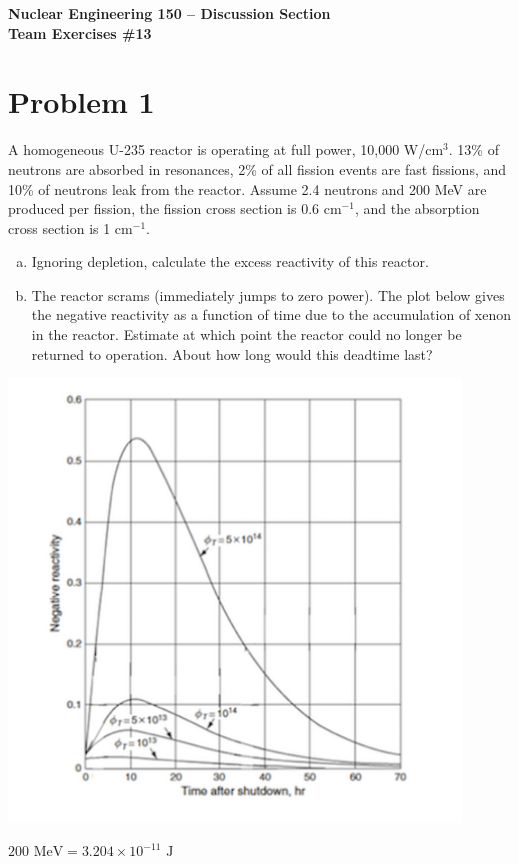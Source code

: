 \documentclass{report}
\begin{document}
\begin{center}
\textbf{\large Nuclear Engineering 150 -- Discussion Section}\\ 
\textbf{Team Exercises \#13}
\end{center}

\section*{Problem 1}

A homogeneous U-235 reactor is operating at full power, 10,000 W/cm$^3$. 13\% of neutrons are absorbed in resonances, 2\% of all fission events are fast fissions, and 10\% of neutrons leak from the reactor. Assume 2.4 neutrons and 200 MeV are produced per fission, the fission cross section is 0.6 cm$^{-1}$, and the absorption cross section is 1 cm$^{-1}$.
\begin{enumerate}[a)]
\item Ignoring depletion, calculate the excess reactivity of this reactor.
\item The reactor scrams (immediately jumps to zero power). The plot below gives the negative reactivity as a function of time due to the accumulation of xenon in the reactor. Estimate at which point the reactor could no longer be returned to operation. About how long would this deadtime last?
\end{enumerate}
\begin{center}
\vspace{1cm}
\includegraphics[width=12cm]{xenon-deadtime}
\end{center}
\vfill
$200\text{ MeV} = 3.204\times10^{-11}\text{ J}$
\end{document}

